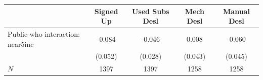 \begin{tabular}{lcccc}
\hline\hline
 & Signed Up & Used Subs Desl & Mech Desl & Manual Desl \\
\hline
Public-who interaction: near5inc & -0.084 & -0.046 & 0.008 & -0.060 \\
 & (0.052) & (0.028) & (0.043) & (0.045) \\
\hline
$N$ & 1397 & 1397 & 1258 & 1258 \\
\hline\hline
\end{tabular}
